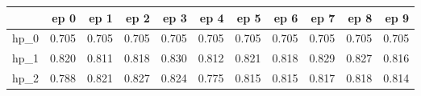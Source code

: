 \begin{tabular}{lrrrrrrrrrr}
\toprule
{} &   ep 0 &   ep 1 &   ep 2 &   ep 3 &   ep 4 &   ep 5 &   ep 6 &   ep 7 &   ep 8 &   ep 9 \\
\midrule
hp\_0 &  0.705 &  0.705 &  0.705 &  0.705 &  0.705 &  0.705 &  0.705 &  0.705 &  0.705 &  0.705 \\
hp\_1 &  0.820 &  0.811 &  0.818 &  0.830 &  0.812 &  0.821 &  0.818 &  0.829 &  0.827 &  0.816 \\
hp\_2 &  0.788 &  0.821 &  0.827 &  0.824 &  0.775 &  0.815 &  0.815 &  0.817 &  0.818 &  0.814 \\
\bottomrule
\end{tabular}
